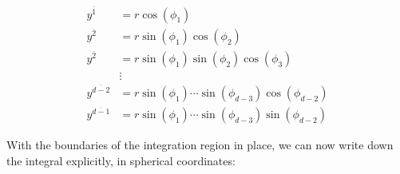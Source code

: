\documentclass[12pt]{article}
\begin{document}
\begin{equation}
\begin{aligned}\label{eq:SphericalCoords}
y^{\overline{1}} &= r \cos(\phi_1)  \\
y^{\overline{2}} &= r \sin(\phi_1) \cos(\phi_2)  \\
y^{\overline{2}} &= r \sin(\phi_1) \sin(\phi_2) \cos(\phi_3)  \\
    &\vdots  \\
y^{\overline{d-2}} &= r \sin(\phi_1) \cdots \sin(\phi_{d-3}) \cos(\phi_{d-2})  \\
y^{\overline{d-1}} &= r \sin(\phi_1) \cdots \sin(\phi_{d-3}) \sin(\phi_{d-2})
\end{aligned}
\end{equation}

With the boundaries of the integration region in place, we can now write down the integral explicitly, in spherical coordinates:
\end{document}
